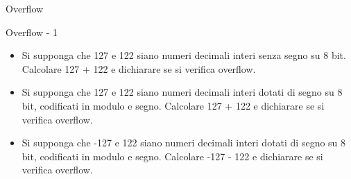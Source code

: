 \documentclass[11pt]{article}
\begin{document}
\begin{quiz}{Overflow}

\begin{cloze}[points=1,shuffle=false]{Overflow - 1}
\begin{itemize}
    \item Si supponga che 127 e 122 siano numeri decimali interi senza segno su 8 bit. Calcolare 127 + 122 e dichiarare se si verifica overflow. 
    \item Si supponga che 127 e 122 siano numeri decimali interi dotati di segno su 8 bit, codificati in modulo e segno. Calcolare 127 + 122 e dichiarare se si verifica overflow. 
    \item Si supponga che -127 e 122 siano numeri decimali interi dotati di segno su 8 bit, codificati in modulo e segno. Calcolare -127 - 122 e dichiarare se si verifica overflow.
\end{itemize}
\end{cloze}


\end{quiz}
\end{document}
